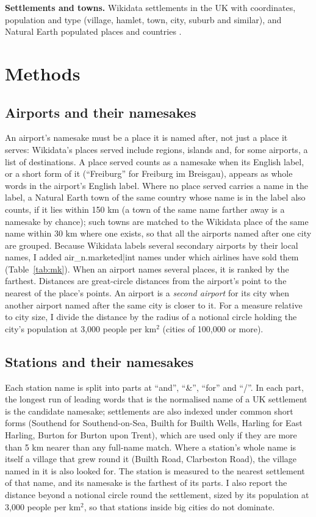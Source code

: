 \documentclass[11pt,a4paper]{article}
\begin{document}
\textbf{Settlements and towns.} Wikidata settlements in the UK with coordinates, population and type (village, hamlet, town, city, suburb and similar), and Natural Earth populated places and countries \citep{naturalearth}.

\section{Methods}
\subsection{Airports and their namesakes}
An airport's namesake must be a place it is named after, not just a place it serves: Wikidata's places served include regions, islands and, for some airports, a list of destinations. A place served counts as a namesake when its English label, or a short form of it (``Freiburg'' for Freiburg im Breisgau), appears as whole words in the airport's English label. Where no place served carries a name in the label, a Natural Earth town of the same country whose name is in the label also counts, if it lies within 150 km (a town of the same name farther away is a namesake by chance); such towns are matched to the Wikidata place of the same name within 30 km where one exists, so that all the airports named after one city are grouped. Because Wikidata labels several secondary airports by their local names, I added {{air_n.marketed|int}} names under which airlines have sold them (Table~\ref{tab:mk}). When an airport names several places, it is ranked by the farthest. Distances are great-circle distances from the airport's point to the nearest of the place's points. An airport is a \emph{second airport} for its city when another airport named after the same city is closer to it. For a measure relative to city size, I divide the distance by the radius of a notional circle holding the city's population at 3,000 people per km$^2$ (cities of 100,000 or more).

\subsection{Stations and their namesakes}
Each station name is split into parts at ``and'', ``\&'', ``for'' and ``/''. In each part, the longest run of leading words that is the normalised name of a UK settlement is the candidate namesake; settlements are also indexed under common short forms (Southend for Southend-on-Sea, Builth for Builth Wells, Harling for East Harling, Burton for Burton upon Trent), which are used only if they are more than 5 km nearer than any full-name match. Where a station's whole name is itself a village that grew round it (Builth Road, Clarbeston Road), the village named in it is also looked for. The station is measured to the nearest settlement of that name, and its namesake is the farthest of its parts. I also report the distance beyond a notional circle round the settlement, sized by its population at 3,000 people per km$^2$, so that stations inside big cities do not dominate.
\end{document}
